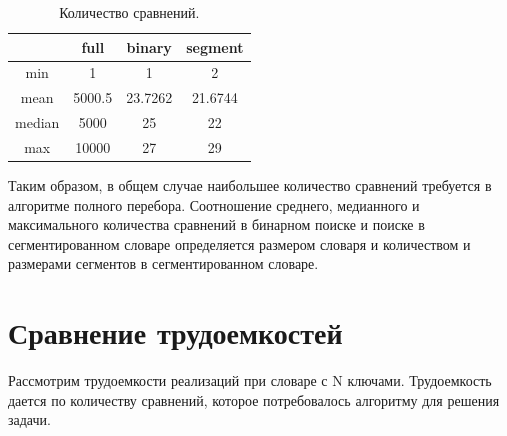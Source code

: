 \begin{table}[h!]
	\begin{center}
		\begin{tabular}{|c | c | c | c |}
			\hline
			 & full & binary & segment \\
			\hline
			min & 1 & 1 & 2 \\
			mean & 5000.5 & 23.7262 & 21.6744 \\
			median & 5000 & 25 & 22 \\
			max & 10000 & 27 & 29 \\
			\hline
		\end{tabular}
	\end{center}
	\caption{\label{tab:cmp} Количество сравнений.}
\end{table}



Таким образом, в общем случае наибольшее количество сравнений требуется в алгоритме полного перебора. Соотношение среднего, медианного и максимального количества сравнений в бинарном поиске и поиске в сегментированном словаре определяется размером словаря и количеством и размерами сегментов в сегментированном словаре.

\clearpage
\section{Сравнение трудоемкостей}

Рассмотрим трудоемкости реализаций при словаре с N ключами. Трудоемкость дается по количеству сравнений, которое потребовалось алгоритму для решения задачи.

